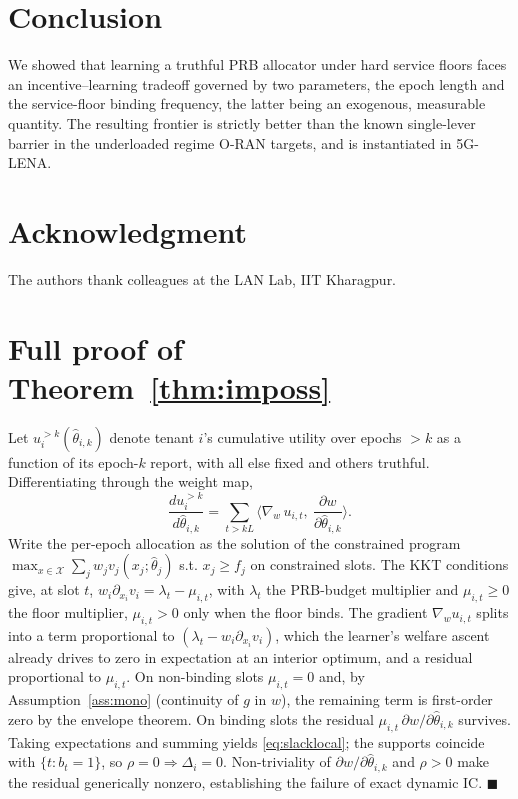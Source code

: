 \documentclass[conference]{IEEEtran}
\theoremstyle{definition}
\theoremstyle{remark}
\newcommand{\rhobind}{\rho}
\newcommand{\type}{\theta}
\newcommand{\alloc}{x}
\newcommand{\allocsp}{\mathcal{X}}
\newcommand{\wt}{w}
\newcommand{\val}{v}
\newcommand{\flo}{f}
\newcommand{\bindind}{b}
\newcommand{\Slack}{\Delta}
\begin{document}
\section{Conclusion}\label{sec:concl}
We showed that learning a truthful PRB allocator under hard service floors faces an incentive--learning tradeoff governed by two parameters, the epoch length and the service-floor binding frequency, the latter being an exogenous, measurable quantity. The resulting frontier is strictly better than the known single-lever barrier in the underloaded regime O-RAN targets, and is instantiated in 5G-LENA.

\section*{Acknowledgment}
The authors thank colleagues at the LAN Lab, IIT Kharagpur.

\appendices

\section{Full proof of Theorem~\ref{thm:imposs}}\label{app:imposs}
Let $u_i^{>k}(\hat\type_{i,k})$ denote tenant $i$'s cumulative utility over epochs $>k$ as a function of its epoch-$k$ report, with all else fixed and others truthful. Differentiating through the weight map,
\[
\frac{d u_i^{>k}}{d\hat\type_{i,k}}=\sum_{t>kL}\Big\langle\nabla_{\wt}\,u_{i,t},\ \frac{\partial\wt}{\partial\hat\type_{i,k}}\Big\rangle .
\]
Write the per-epoch allocation as the solution of the constrained program $\max_{\alloc\in\allocsp}\sum_j\wt_j\val_j(\alloc_j;\hat\type_j)$ s.t. $\alloc_{j}\ge\flo_j$ on constrained slots. The KKT conditions give, at slot $t$, $\wt_i\partial_{\alloc_i}\val_i=\lambda_t-\mu_{i,t}$, with $\lambda_t$ the PRB-budget multiplier and $\mu_{i,t}\ge0$ the floor multiplier, $\mu_{i,t}>0$ only when the floor binds. The gradient $\nabla_{\wt}u_{i,t}$ splits into a term proportional to $(\lambda_t-\wt_i\partial_{\alloc_i}\val_i)$, which the learner's welfare ascent already drives to zero in expectation at an interior optimum, and a residual proportional to $\mu_{i,t}$. On non-binding slots $\mu_{i,t}=0$ and, by Assumption~\ref{ass:mono} (continuity of $g$ in $\wt$), the remaining term is first-order zero by the envelope theorem. On binding slots the residual $\mu_{i,t}\,\partial\wt/\partial\hat\type_{i,k}$ survives. Taking expectations and summing yields \eqref{eq:slacklocal}; the supports coincide with $\{t:\bindind_t=1\}$, so $\rhobind=0\Rightarrow\Slack_i=0$. Non-triviality of $\partial\wt/\partial\hat\type_{i,k}$ and $\rhobind>0$ make the residual generically nonzero, establishing the failure of exact dynamic IC. \hfill$\blacksquare$
\end{document}
